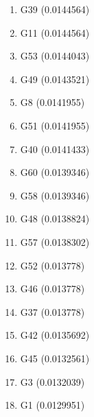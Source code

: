 \begin{enumerate}
\item G39 (0.0144564)
\item G11 (0.0144564)
\item G53 (0.0144043)
\item G49 (0.0143521)
\item G8 (0.0141955)
\item G51 (0.0141955)
\item G40 (0.0141433)
\item G60 (0.0139346)
\item G58 (0.0139346)
\item G48 (0.0138824)
\item G57 (0.0138302)
\item G52 (0.013778)
\item G46 (0.013778)
\item G37 (0.013778)
\item G42 (0.0135692)
\item G45 (0.0132561)
\item G3 (0.0132039)
\item G1 (0.0129951)
\end{enumerate}